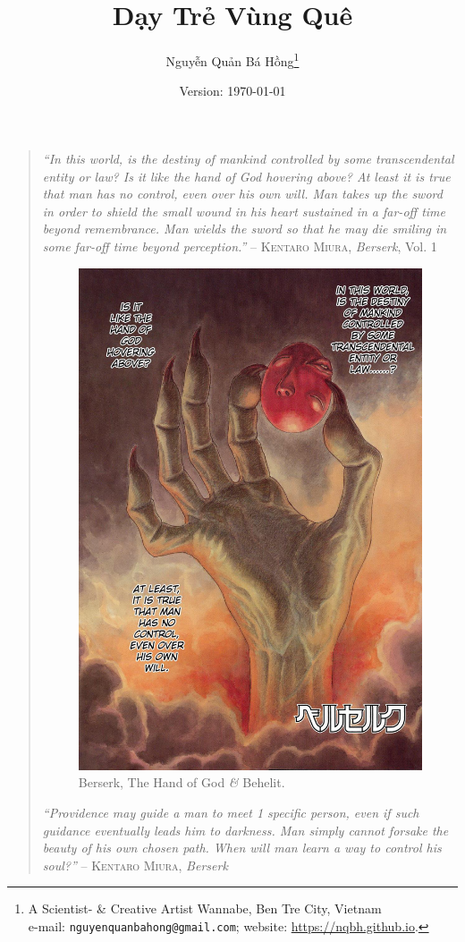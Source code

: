 \documentclass[11pt,oneside]{book}
\title{Dạy Trẻ Vùng Quê}
\author{Nguyễn Quản Bá Hồng\footnote{A Scientist- \& Creative Artist Wannabe, Ben Tre City, Vietnam\\e-mail: \texttt{nguyenquanbahong@gmail.com}; website: \url{https://nqbh.github.io}.}}
\date{\textsf{Version: \today}}
\begin{document}
\maketitle
\begin{quotation}
	\textit{``In this world, is the destiny of mankind controlled by some transcendental entity or law? Is it like the hand of God hovering above? At least it is true that man has no control, even over his own will. Man takes up the sword in order to shield the small wound in his heart sustained in a far-off time beyond remembrance. Man wields the sword so that he may die smiling in some far-off time beyond perception.''} -- \textsc{Kentaro Miura}, \textit{Berserk}, Vol. 1
	\begin{figure}[H]
		\centering
		\includegraphics[scale=.15]{Berserk_behelit_color}
		\caption{Berserk, The Hand of God \textit{\&} Behelit.}
	\end{figure}	
	\textit{``Providence may guide a man to meet 1 specific person, even if such guidance eventually leads him to darkness. Man simply cannot forsake the beauty of his own chosen path. When will man learn a way to control his soul?''} – \textsc{Kentaro Miura}, \textit{Berserk}
\end{quotation}
\end{document}
